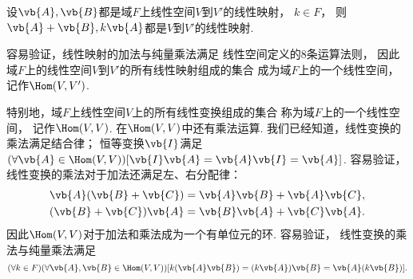 \begin{proposition}
设\(\vb{A},\vb{B}\)都是域\(F\)上线性空间\(V\)到\(V'\)的线性映射，
\(k\in F\)，
则\(\vb{A}+\vb{B},k\vb{A}\)都是\(V\)到\(V'\)的线性映射.
\end{proposition}

容易验证，线性映射的加法与纯量乘法满足
线性空间定义的8条运算法则，
因此域\(F\)上的线性空间\(V\)到\(V'\)的所有线性映射组成的集合
成为域\(F\)上的一个线性空间，
记作\(\Hom(V,V')\).

特别地，域\(F\)上线性空间\(V\)上的所有线性变换组成的集合
称为域\(F\)上的一个线性空间，
记作\(\Hom(V,V)\).
在\(\Hom(V,V)\)中还有乘法运算.
我们已经知道，线性变换的乘法满足结合律；
恒等变换\(\vb{I}\)满足
\((\forall\vb{A}\in\Hom(V,V))[\vb{I}\vb{A}=\vb{A}\vb{I}=\vb{A}]\).
容易验证，线性变换的乘法对于加法还满足左、右分配律：\begin{gather*}
	\vb{A}(\vb{B}+\vb{C})=\vb{A}\vb{B}+\vb{A}\vb{C}, \\
	(\vb{B}+\vb{C})\vb{A}=\vb{B}\vb{A}+\vb{C}\vb{A}.
\end{gather*}
因此\(\Hom(V,V)\)对于加法和乘法成为一个有单位元的环.
容易验证，
线性变换的乘法与纯量乘法满足\[
	(\forall k\in F)
	(\forall\vb{A},\vb{B}\in\Hom(V,V))
	[k(\vb{A}\vb{B})=(k\vb{A})\vb{B}=\vb{A}(k\vb{B})].
\]
